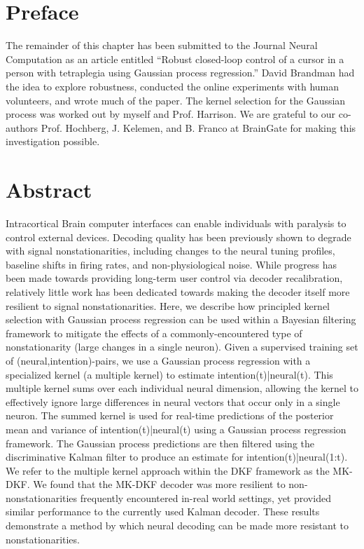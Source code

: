 
\section{Preface}
The remainder of this chapter has been submitted to the Journal Neural Computation as an article entitled ``Robust closed-loop control of a cursor in a person with tetraplegia using Gaussian process regression.'' David Brandman had the idea to explore robustness, conducted the online experiments with human volunteers, and wrote much of the paper.  The kernel selection for the Gaussian process was worked out by myself and Prof. Harrison.  We are grateful to our co-authors Prof. Hochberg, J. Kelemen, and B. Franco at BrainGate for making this investigation possible.

\section{Abstract}
Intracortical Brain computer interfaces can enable individuals with paralysis to control external devices. Decoding quality has been previously shown to degrade with signal nonstationarities, including changes to the neural tuning profiles, baseline shifts in firing rates, and non-physiological noise. While progress has been made towards providing long-term user control via decoder recalibration, relatively little work has been dedicated towards making the decoder itself more resilient to signal nonstationarities. Here, we describe how principled kernel selection with Gaussian process regression can be used within a Bayesian filtering framework to mitigate the effects of  a commonly-encountered type of nonstationarity (large changes in a single neuron).  Given a supervised training set of (neural,intention)-pairs, we use a Gaussian process regression with a specialized kernel (a multiple kernel) to estimate intention(t)|neural(t).  This multiple kernel sums over each individual neural dimension, allowing the kernel to effectively ignore large differences in neural vectors that occur only in a single neuron. The summed kernel is used for real-time predictions of the posterior mean and variance of intention(t)|neural(t) using a Gaussian process regression framework. The Gaussian process predictions are then filtered using the discriminative Kalman filter to produce an estimate for intention(t)|neural(1:t). We refer to the multiple kernel approach within the DKF framework as the MK-DKF. We found that the MK-DKF decoder was more resilient to non-nonstationarities frequently encountered in-real world settings, yet provided similar performance to the currently used Kalman decoder. These results demonstrate a method by which neural decoding can be made more resistant to nonstationarities.

